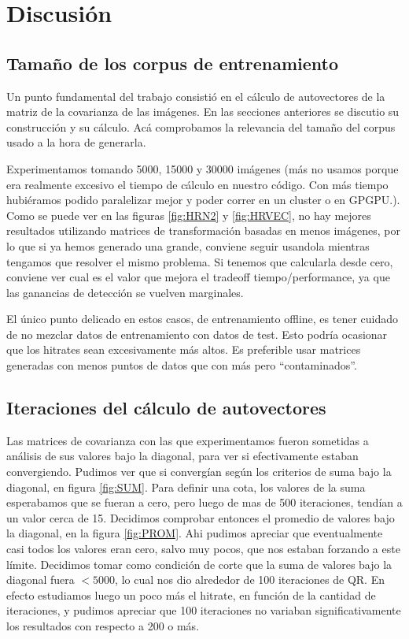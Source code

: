 \section{Discusi\'on}

\subsection{Tama\~no de los corpus de entrenamiento }
Un punto fundamental del trabajo consisti\'o en el c\'alculo de autovectores de la matriz
de la covarianza de las im\'agenes. En las secciones anteriores se discutio su construcci\'on
y su c\'alculo. Ac\'a comprobamos la relevancia del tama\~no del corpus usado a la hora
de generarla.

Experimentamos tomando 5000, 15000 y 30000 im\'agenes (m\'as no usamos porque era
realmente excesivo el tiempo de c\'alculo en nuestro c\'odigo. Con m\'as tiempo hubi\'eramos podido paralelizar mejor
y poder correr en un cluster o en GPGPU.). 
Como se puede ver en las figuras \ref{fig:HRN2} y \ref{fig:HRVEC},
no hay mejores resultados utilizando matrices de transformaci\'on basadas en menos im\'agenes, por lo que
si ya hemos generado una grande, conviene seguir usandola mientras tengamos que resolver
el mismo problema. Si tenemos que calcularla desde cero, conviene ver cual es el valor que mejora
el tradeoff tiempo/performance, ya que las ganancias de detecci\'on se vuelven marginales.

El \'unico punto delicado en estos casos, de entrenamiento offline, es tener cuidado
de no mezclar datos de entrenamiento con datos de test. Esto podr\'ia ocasionar que
los hitrates sean excesivamente m\'as altos. Es preferible usar matrices generadas
con menos puntos de datos que con m\'as pero ``contaminados''.


\subsection{Iteraciones del c\'alculo de autovectores}
Las matrices de covarianza con las que experimentamos fueron sometidas a
an\'alisis de sus valores bajo la diagonal, para ver si efectivamente estaban
convergiendo. Pudimos ver que si converg\'ian seg\'un
los criterios de suma bajo la diagonal, en figura \ref{fig:SUM}. Para definir
una cota, los valores de la suma esperabamos que se fueran a cero, pero
luego de mas de 500 iteraciones, tend\'ian a un valor cerca de 15. Decidimos
comprobar entonces el promedio de valores bajo la diagonal, en la figura \ref{fig:PROM}.
Ahi pudimos apreciar que eventualmente casi todos los valores eran cero, salvo muy pocos,
que nos estaban forzando a este l\'imite. Decidimos tomar como condici\'on de corte
que la suma de valores bajo la diagonal fuera $<5000$, lo cual nos dio
alrededor de 100 iteraciones de QR. En efecto estudiamos luego un poco m\'as 
el hitrate, en funci\'on de la cantidad de iteraciones, y pudimos apreciar que
100 iteraciones no variaban significativamente los resultados con respecto a 200 o m\'as.

